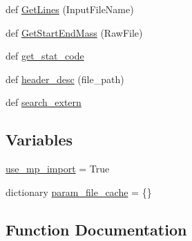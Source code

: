 \begin{DoxyCompactItemize}
\item 
def \hyperlink{namespace_uni_dec_1_1unidec__modules_1_1tims__import__wizard_1_1data__importer_a8d809539cbc02ccf10df62fc15907482}{Get\+Lines} (Input\+File\+Name)
\item 
def \hyperlink{namespace_uni_dec_1_1unidec__modules_1_1tims__import__wizard_1_1data__importer_a210d3453f7c58045f40db538275ae672}{Get\+Start\+End\+Mass} (Raw\+File)
\item 
def \hyperlink{namespace_uni_dec_1_1unidec__modules_1_1tims__import__wizard_1_1data__importer_a23b17b616d5068e66ec5283c0bf526f3}{get\+\_\+stat\+\_\+code}
\item 
def \hyperlink{namespace_uni_dec_1_1unidec__modules_1_1tims__import__wizard_1_1data__importer_ac65c9bfacf104c7fb18df5fd005cf4db}{header\+\_\+desc} (file\+\_\+path)
\item 
def \hyperlink{namespace_uni_dec_1_1unidec__modules_1_1tims__import__wizard_1_1data__importer_a87e7d011f1b873060ab0d61791806948}{search\+\_\+extern}
\end{DoxyCompactItemize}
\subsection*{Variables}
\begin{DoxyCompactItemize}
\item 
\hyperlink{namespace_uni_dec_1_1unidec__modules_1_1tims__import__wizard_1_1data__importer_aad3c6adbe259f5eb8ce02791b71a45ac}{use\+\_\+mp\+\_\+import} = True
\item 
dictionary \hyperlink{namespace_uni_dec_1_1unidec__modules_1_1tims__import__wizard_1_1data__importer_a0cffe151bf0ac7e8ea190ca7d8e3f875}{param\+\_\+file\+\_\+cache} = \{\}
\end{DoxyCompactItemize}


\subsection{Function Documentation}
\hypertarget{namespace_uni_dec_1_1unidec__modules_1_1tims__import__wizard_1_1data__importer_a671b9499cdd4171fd96a7818de0b140f}{}
